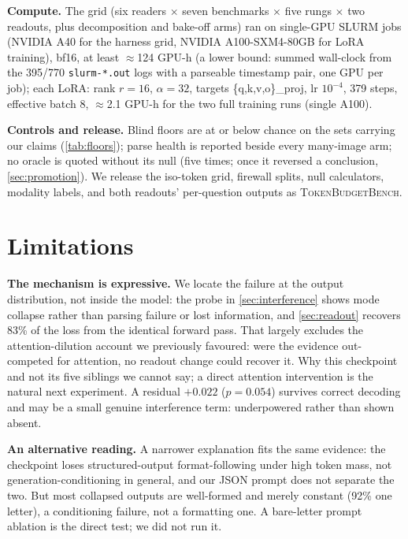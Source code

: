 \documentclass[10pt,twocolumn,letterpaper]{article}
\begin{document}
\noindent\textbf{Compute.} The grid (six readers $\times$ seven benchmarks $\times$ five rungs $\times$ two readouts, plus decomposition and bake-off arms) ran on single-GPU SLURM jobs (NVIDIA A40 for the harness grid, NVIDIA A100-SXM4-80GB for LoRA training), bf16, at least $\approx$124 GPU-h (a lower bound: summed wall-clock from the 395/770 \texttt{slurm-*.out} logs with a parseable timestamp pair, one GPU per job); each LoRA: rank $r{=}16$, $\alpha{=}32$, targets \{q,k,v,o\}\_proj, lr $10^{-4}$, 379 steps, effective batch 8, $\approx$2.1 GPU-h for the two full training runs (single A100).

\noindent\textbf{Controls and release.} Blind floors are at or below chance on the sets carrying our claims (\cref{tab:floors}); parse health is reported beside every many-image arm; no oracle is quoted without its null (five times; once it reversed a conclusion, \cref{sec:promotion}). We release the iso-token grid, firewall splits, null calculators, modality labels, and both readouts' per-question outputs as \textsc{TokenBudgetBench}.

\section{Limitations}
\label{sec:limitations}

\noindent\textbf{The mechanism is expressive.} We locate the failure at the output distribution, not inside the model: the probe in \cref{sec:interference} shows mode collapse rather than parsing failure or lost information, and \cref{sec:readout} recovers 83\% of the loss from the identical forward pass. That largely excludes the attention-dilution account we previously favoured: were the evidence out-competed for attention, no readout change could recover it. Why this checkpoint and not its five siblings we cannot say; a direct attention intervention is the natural next experiment. A residual $+0.022$ ($p{=}0.054$) survives correct decoding and may be a small genuine interference term: underpowered rather than shown absent.

\noindent\textbf{An alternative reading.} A narrower explanation fits the same evidence: the checkpoint loses structured-output format-following under high token mass, not generation-conditioning in general, and our JSON prompt does not separate the two. But most collapsed outputs are well-formed and merely constant (92\% one letter), a conditioning failure, not a formatting one. A bare-letter prompt ablation is the direct test; we did not run it.
\end{document}
